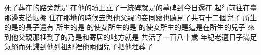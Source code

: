 死了\chientien 葬在的路旁\yuentien{}就是\chuan 
{}在他的墳上立了一統碑\chientien 就是的墓碑\chientien 到今日還在\chuan 
{}起行前往\chientien 在臺那邊支搭帳棚\chuan 
{}住在那地的時候\chientien{}去與他父親的妾同寢\chientien{}也聽見了\chuan\Chuan{}共有十二個兒子\chuan 
{}所生的\chientien 是的長子\chientien 還有\chientien{}\chientien{}\chientien{}\chientien{}\chuan 
{}所生的是\chientien{}\chuan 
{}的使女所生的是\chientien{}\chuan 
{}的使女所生的是\chientien{}\chientien 這是在所生的兒子\chuan 
{}來到他父親那裡\chientien 到了的\chientien 乃是和寄居的地方\yuentien{}就是\chuan\Chuan
{}共活了一百八十歲\chuan 
{}年紀老邁\chientien 日子滿足\chientien 氣絕而死\chientien 歸到他列祖那裡\yuentien 他兩個兒子把他埋葬了\chuan 
